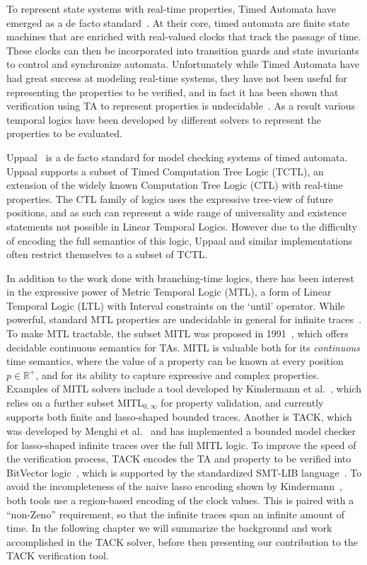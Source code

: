 \documentclass[a4paper,11pt]{report}
\theoremstyle{definition}
\begin{document}
To represent state systems with real-time properties, Timed Automata have
emerged as a de facto standard~\cite{alur94}. At their core, timed automata are
finite state machines that are enriched with real-valued clocks that track the
passage of time. These clocks can then be incorporated into transition guards
and state invariants to control and synchronize automata. Unfortunately while
Timed Automata have had great success at modeling real-time systems, they have
not been useful for representing the properties to be verified, and in fact it
has been shown that verification using TA to represent properties is
undecidable~\cite{alur94}. As a result various temporal logics have been
developed by different solvers to represent the properties to be evaluated.

Uppaal~\cite{larsen97} is a de facto standard for model checking systems of timed
automata. Uppaal supports a subset of Timed Computation Tree Logic (TCTL), an
extension of the widely known Computation Tree Logic (CTL) with real-time
properties. The CTL family of logics uses the expressive tree-view of future
positions, and as such can represent a wide range of universality and existence
statements not possible in Linear Temporal Logics. However due to the difficulty
of encoding the full semantics of this logic, Uppaal and similar implementations
often restrict themselves to a subset of TCTL.

In addition to the work done with branching-time logics, there has been interest
in the expressive power of Metric Temporal Logic (MTL), a form of Linear
Temporal Logic (LTL) with Interval constraints on the `until' operator. While
powerful, standard MTL properties are undecidable in general for infinite
traces~\cite{bouyer09}. To make MTL tractable, the subset MITL was proposed in
1991~\cite{Alur91thebenefits}, which offers decidable continuous semantics for
TAs. MITL is valuable both for its \emph{continuous} time semantics, where the
value of a property can be known at every position $p \in \mathbb{R^{+}}$, and
for its ability to capture expressive and complex properties. Examples of MITL
solvers include a tool developed by Kindermann et al.~\cite{kindermann13}, which
relies on a further subset $\text{MITL}_{0,\infty}$ for property validation, and
currently supports both finite and lasso-shaped bounded traces. Another is TACK,
which was developed by Menghi et al.~\cite{tack20} and has implemented a bounded
model checker for lasso-shaped infinite traces over the full MITL logic. To
improve the speed of the verification process, TACK encodes the TA and property
to be verified into BitVector logic~\cite{baresi15,baresi16}, which is supported
by the standardized SMT-LIB language~\cite{BarFT-SMTLIB}. To avoid the
incompleteness of the naive lasso encoding shown by
Kindermann~\cite{kindermann12}, both tools use a region-based encoding of the
clock values. This is paired with a ``non-Zeno'' requirement, so that the
infinite traces span an infinite amount of time. In the following chapter we
will summarize the background and work accomplished in the TACK solver, before
then presenting our contribution to the TACK verification tool.
\end{document}
